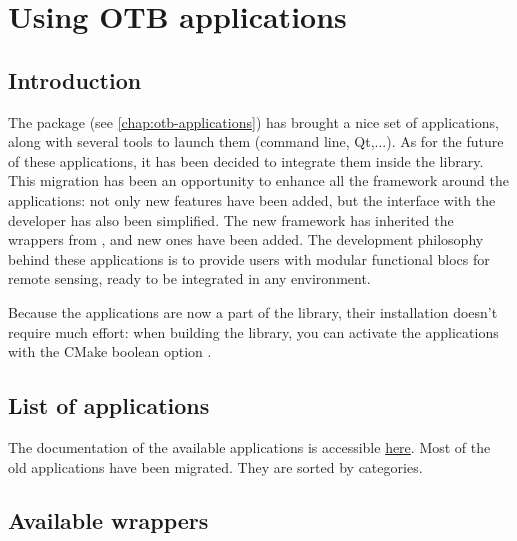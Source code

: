 \chapter{Using OTB applications}\label{chap:WrappedApplications}

\section{Introduction}\label{sec:wrappedAppliIntro}
The \app package (see \ref{chap:otb-applications}) has brought a nice set of 
applications, along with several tools to launch them (command line, Qt,...).
As for the future of these applications, it has been decided to integrate 
them inside the \otb library. This migration has been an opportunity to 
enhance all the framework around the applications: not only new features have
 been added, but the interface with the developer has also been simplified. 
The new framework has inherited the wrappers from \app, and new ones have been
added. The development philosophy behind these applications is to provide users 
with modular functional blocs for remote sensing, ready to be integrated in any
environment. 

Because the applications are now a part of the library, their installation doesn't
require much effort: when building the \otb library, you can activate the applications 
with the CMake boolean option .

\section{List of applications}\label{sec:wrappedAppliList}
The documentation of the available applications is accessible 
\href{http://orfeo-toolbox.org/Applications}{here}. Most of the old applications have
been migrated. They are sorted by categories.

\section{Available wrappers}\label{sec:wrappedAppliWrappers}

